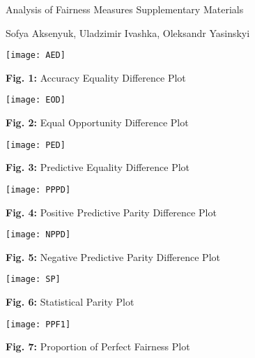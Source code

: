 \documentclass[a4paper, 12pt]{article}
\begin{document}
  
\begin{center}  
\LARGE Analysis of Fairness Measures
\bigbreak
\bigbreak
\Large Supplementary Materials
\bigbreak
\end{center}
\Large Sofya Aksenyuk, Uladzimir Ivashka, Oleksandr Yasinskyi
\bigbreak
\bigbreak

\texttt{[image: AED]}
\begin{center}

\normalsize{\textbf{Fig. 1:} Accuracy Equality Difference Plot}
\end{center}

\texttt{[image: EOD]}
\begin{center}

\normalsize{\textbf{Fig. 2:} Equal Opportunity Difference Plot}
\end{center}



\texttt{[image: PED]}
\begin{center}

\normalsize{\textbf{Fig. 3:} Predictive Equality Difference Plot}
\end{center}




\texttt{[image: PPPD]}
\begin{center}

\normalsize{\textbf{Fig. 4:} Positive Predictive Parity Difference Plot}
\end{center}




\texttt{[image: NPPD]}
\begin{center}

\normalsize{\textbf{Fig. 5:} Negative Predictive Parity Difference Plot}
\end{center}


\texttt{[image: SP]}
\begin{center}

\normalsize{\textbf{Fig. 6:} Statistical Parity Plot}
\end{center}



\texttt{[image: PPF1]}
\begin{center}

\normalsize{\textbf{Fig. 7:} Proportion of Perfect Fairness Plot}
\end{center}
\end{document}
